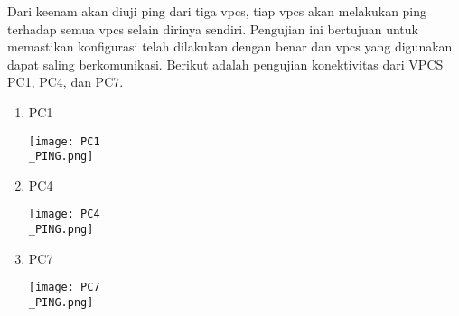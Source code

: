 \documentclass[12pt, a4paper]{article}
\begin{document}
\begin{enumerate}
      \vspace{1cm}

    Dari keenam akan diuji ping dari tiga vpcs, tiap vpcs akan melakukan
    ping terhadap semua vpcs selain dirinya sendiri. Pengujian ini
    bertujuan untuk memastikan konfigurasi telah dilakukan dengan 
    benar dan vpcs yang digunakan dapat saling berkomunikasi.
    Berikut adalah pengujian konektivitas dari VPCS PC1, PC4, dan PC7.

    \begin{enumerate}
      \item PC1

        \begin{center}
              \texttt{[image: PC1\\\_PING.png]}
        \end{center}
        \newpage

      \item PC4

        \begin{center}
              \texttt{[image: PC4\\\_PING.png]}
        \end{center}
        \newpage

      \item PC7

        \begin{center}
              \texttt{[image: PC7\\\_PING.png]}
        \end{center}
        \newpage

    \end{enumerate}

  \end{enumerate}
\end{document}
